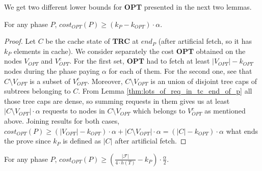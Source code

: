 We get two different lower bounds for \textbf{OPT} presented in the next two 
lemmas. 
\begin{lemma}
For any phase $P$, $cost_{OPT}(P) \geq (k_P - k_{OPT}) \cdot \alpha$. 
\end{lemma}
\begin{proof}
Let $C$ be the cache state of \textbf{TRC} at $end_P$ (after artificial fetch, 
so it has $k_P$ elements in cache). We consider separately the cost 
\textbf{OPT} obtained on the nodes $V_{OPT}$ and $V_{OPT}^c$. For the first 
set, \textbf{OPT} had to fetch at least $|V_{OPT}| - k_{OPT}$ nodes during the 
phase paying $\alpha$ for each of them. For the second one, see that 
$C \setminus V_{OPT}$ is a subset of $V_{OPT}^c$. Moreover, $C \setminus 
V_{OPT}$ is an union of disjoint tree caps of subtrees belonging to $C$. From 
Lemma \ref{thm:lots_of_req_in_tc_end_of_p} all those tree caps are dense, so 
summing requests in them gives us at least $|C \setminus V_{OPT}| \cdot 
\alpha$ requests to nodes in $C \setminus V_{OPT}$ which belongs to $V_{OPT}^c$ 
as mentioned above. Joining results for both cases, $cost_{OPT}(P) \geq 
(|V_{OPT}| - k_{OPT}) \cdot \alpha + |C \setminus V_{OPT}| \cdot 
\alpha = (|C| - k_{OPT}) \cdot \alpha$ what ends the prove since $k_P$ is 
defined as $|C|$ after artificial fetch. 
\end{proof}
\begin{lemma}
For any phase $P$, $cost_{OPT}(P) \geq (\frac{|\mathcal{F}|}{4 \cdot h(T)} 
-k_P) \cdot \frac{\alpha}{2}$. 
\end{lemma}
